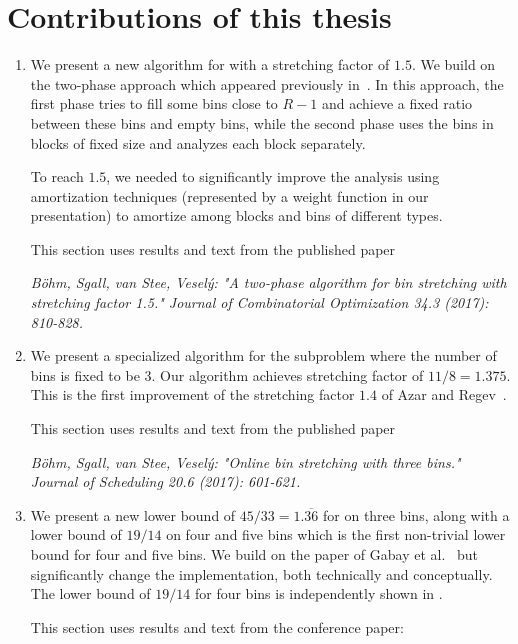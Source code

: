 \section{Contributions of this thesis}\label{sec:contrib}


\begin{enumerate}
\item We present a new algorithm for \binstretch
with a stretching factor of $1.5$.  We build on the two-phase approach
which appeared previously in~\cite{kellerer2013,gabay2013}. In this
approach, the first phase tries to fill some bins close to $R-1$ and
achieve a fixed ratio between these bins and empty bins, while the
second phase uses the bins in blocks of fixed size and analyzes each
block separately. 

To reach $1.5$, we needed to significantly improve the analysis using
amortization techniques (represented by a weight function in our
presentation) to amortize among blocks and bins of different types.

This section uses results and text from the published paper

\noindent\textit{Böhm, Sgall, van Stee, Veselý: "A two-phase algorithm
for bin stretching with stretching factor 1.5." Journal of
Combinatorial Optimization 34.3 (2017): 810-828.}

\item We present a specialized algorithm for the subproblem where the
number of bins is fixed to be 3. Our algorithm achieves stretching
factor of $11/8 = 1.375$.  This is the first improvement of the
stretching factor $1.4$ of Azar and Regev~\cite{azar98}.

This section uses results and text from the published paper

\noindent\textit{Böhm, Sgall, van Stee, Veselý: "Online bin
stretching with three bins." Journal of Scheduling 20.6 (2017):
601-621.}

\item We present a new lower bound of $45/33 = 1.\overline{36}$ for
\binstretch on three bins, along with a lower bound of $19/14$ on four
and five bins which is the first non-trivial lower bound for four and
five bins. We build on the paper of Gabay et al.~\cite{gabay2013lbv2}
but significantly change the implementation, both technically and
conceptually. The lower bound of $19/14$ for four bins is
independently shown in \cite{gabay2015lbv3}.

This section uses results and text from the conference paper:


\end{enumerate}

